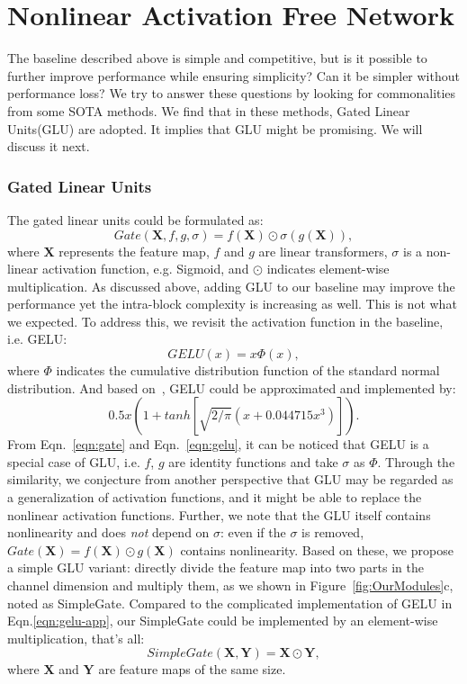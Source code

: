 \documentclass[runningheads]{llncs}
\begin{document}
\section{Nonlinear Activation Free Network}
The baseline described above is simple and competitive, but is it possible to further improve performance while ensuring simplicity?
Can it be simpler without performance loss? 
We try to answer these questions by looking for commonalities from some SOTA methods\cite{tu2022maxim,zamir2021restormer,liang2022vrt,hua2022transformer}. We find that in these methods, Gated Linear Units\cite{dauphin2017language}(GLU) are adopted. It implies that GLU might be promising. We will discuss it next.
\subsubsection{Gated Linear Units}
The gated linear units could be formulated as:
\begin{equation}\label{eqn:gate}
Gate(\mathbf{X}, f, g, \sigma) = f(\mathbf{X})\odot\sigma(g(\mathbf{X})),
\end{equation}
where $\mathbf{X}$ represents the feature map, $f$ and $g$ are linear transformers, $\sigma$ is a non-linear activation function, e.g. Sigmoid, and $\odot$ indicates element-wise multiplication. As discussed above, adding GLU to our baseline may improve the performance yet the intra-block complexity is increasing as well. This is not what we expected. To address this, we revisit the activation function in the baseline, i.e. GELU\cite{hendrycks2016gaussian}:
\begin{equation}\label{eqn:gelu}
GELU(x) =x \Phi(x),
\end{equation}
 where $\Phi$ indicates the cumulative distribution function of the standard normal distribution. And based on~\cite{hendrycks2016gaussian}, GELU could be approximated and implemented by:
 \begin{equation}\label{eqn:gelu-app}
 0.5x(1+tanh[\sqrt{2/\pi}(x+0.044715x^3)]).
 \end{equation}
From Eqn.~\ref{eqn:gate} and Eqn.~\ref{eqn:gelu}, it can be noticed that GELU is a special case of GLU, i.e. $f$, $g$ are identity functions and take $\sigma$ as $\Phi$. 
Through the similarity, we conjecture from another perspective that GLU may be regarded as a generalization of activation functions, and it might be able to replace the nonlinear activation functions.
Further, we note that the GLU itself contains nonlinearity and does \emph{not} depend on $\sigma$: even if the $\sigma$ is removed, $Gate(\mathbf{X})=f(\mathbf{X})\odot g(\mathbf{X})$ contains nonlinearity. Based on these, we propose a simple GLU variant: directly divide the feature map into two parts in the channel dimension and multiply them, as we shown in Figure~\ref{fig:OurModules}c, noted as SimpleGate. Compared to the complicated implementation of GELU in Eqn.\ref{eqn:gelu-app}, our SimpleGate could be implemented by an element-wise multiplication, that's all:
\begin{equation}\label{eqn:simple-gate}
SimpleGate(\mathbf{X},\mathbf{Y}) = \mathbf{X\odot Y},
\end{equation}
where $\mathbf{X}$ and $\mathbf{Y}$ are feature maps of the same size. 
\end{document}
